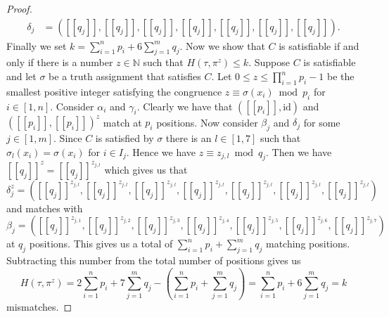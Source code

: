 \documentclass{article}
\newcommand{\llbracket}{[\![}
\newcommand{\rrbracket}{]\!]}
\begin{document}
\begin{proof}
\begin{align*}
\delta_j&=(\llbracket  q_j \rrbracket, \llbracket  q_j \rrbracket, \llbracket  q_j \rrbracket, \llbracket  q_j \rrbracket, \llbracket  q_j \rrbracket, \llbracket  q_j \rrbracket, \llbracket  q_j \rrbracket).
\end{align*}
Finally we set $k = \sum_{i=1}^n p_i + 6\sum_{j=1}^m q_j$. Now we show that $C$ is satisfiable if and only if there is a number $z \in \mathbb{N}$ such that $H(\tau,\pi^z) \leq k$. Suppose $C$ is satisfiable and let $\sigma$ be a truth assignment that satisfies $C$. Let $0 \leq z \leq \prod_{i=1}^n p_i - 1$ be the smallest positive integer satisfying the congruence $z \equiv \sigma(x_i) \bmod p_i$ for $i \in [1,n]$. Consider $\alpha_i$ and $\gamma_i$. Clearly we have that $(\llbracket  p_i \rrbracket, \mathrm{id})$ and $(\llbracket  p_i \rrbracket, \llbracket  p_i \rrbracket)^z$ match at $p_i$ positions. Now consider $\beta_j$ and $\delta_j$ for some $j \in [1,m]$. Since $C$ is satisfied by $\sigma$ there is an $l \in [1,7]$ such that $\sigma_l(x_i) = \sigma(x_i)$ for $i \in I_j$. Hence we have $z \equiv z_{j,l} \bmod q_j$. Then we have $\llbracket  q_j \rrbracket^z = \llbracket  q_j \rrbracket^{z_{j,l}}$ which gives us that
\begin{displaymath}
\delta_j^z = (\llbracket  q_j \rrbracket^{z_{j,l}}, \llbracket  q_j \rrbracket^{z_{j,l}}, \llbracket  q_j \rrbracket^{z_{j,l}}, \llbracket  q_j \rrbracket^{z_{j,l}}, \llbracket  q_j \rrbracket^{z_{j,l}}, \llbracket  q_j \rrbracket^{z_{j,l}}, \llbracket  q_j \rrbracket^{z_{j,l}})
\end{displaymath}
and matches with
\begin{displaymath}
\beta_j = (\llbracket  q_j \rrbracket^{z_{j,1}}, \llbracket  q_j \rrbracket^{z_{j,2}}, \llbracket  q_j \rrbracket^{z_{j,3}}, \llbracket  q_j \rrbracket^{z_{j,4}}, \llbracket  q_j \rrbracket^{z_{j,5}}, \llbracket  q_j \rrbracket^{z_{j,6}}, \llbracket  q_j \rrbracket^{z_{j,7}})
\end{displaymath}
at $q_j$ positions. This gives us a total of $\sum_{i=1}^n p_i + \sum_{j=1}^m q_j$ matching positions. Subtracting this number from the total number of positions gives us
\begin{displaymath}
H(\tau,\pi^z) = 2\sum_{i=1}^n p_i + 7\sum_{j=1}^m q_j - (\sum_{i=1}^n p_i + \sum_{j=1}^m q_j) = \sum_{i=1}^n p_i + 6\sum_{j=1}^m q_j = k
\end{displaymath}
mismatches.


\end{proof}
\end{document}
